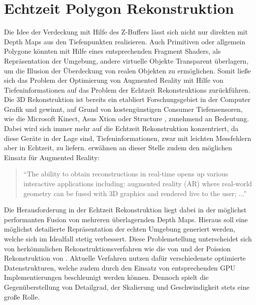\section{Echtzeit Polygon Rekonstruktion} \label{sec:polygon_reconstruction}

Die Idee der Verdeckung mit Hilfe des Z-Buffers lässt sich nicht nur direkten mit Depth Maps aus den Tiefenpunkten realisieren. Auch Primitiven oder allgemein Polygone könnten mit Hilfe eines entsprechenden Fragment Shaders, als Repräsentation der Umgebung, andere virtuelle Objekte Transparent überlagern, um die Illusion der Überdeckung von realen Objekten zu ermöglichen. Somit ließe sich das Problem der Optimierung von Augmented Reality mit Hilfe von Tiefeninformationen auf das Problem der Echtzeit Rekonstruktions zurückführen. \\

Die 3D Rekonstruktion ist bereits ein etabliert Forschungsgebiet in der Computer Grafik und gewinnt, auf Grund von kostengünstigen Consumer Tiefensensoren, wie die Microsoft Kinect, Asus Xtion oder Structure \citep{Struc48:online}, zunehmend an Bedeutung. Dabei wird sich immer mehr auf die Echtzeit Rekonstruktion konzentriert, da diese Geräte in der Lage sind, Tiefeninformationen, zwar mit leichten Messfehlern aber in Echtzeit, zu liefern. \citet{niessner2013real} erwähnen an dieser Stelle zudem den möglichen Einsatz für Augmented Reality:

\begin{quote}
\enquote{The ability to obtain reconstructions
in real-time opens up various interactive applications including:
augmented reality (AR) where real-world geometry can be fused
with 3D graphics and rendered live to the user; ...} \citep{niessner2013real}
\end{quote}

Die Herausforderung in der Echtzeit Rekonstruktion liegt dabei in der möglichst performanten Fusion von mehreren überlagernden Depth Maps. Hieraus soll eine möglichst detailierte Repräsentation der echten Umgebung generiert werden, welche sich im Idealfall stetig verbessert. Diese Problemstellung unterscheidet sich von herkömmlichen Rekonstruktionsverfahren wie die von \citet{hoppe1992surface} und der Poission Rekonstruktion von \citet{kazhdan2006poisson}. Aktuelle Verfahren nutzen dafür verschiedenste optimierte Datenstrukturen, welche zudem durch den Einsatz von entsprechenden GPU Implementierungen beschleunigt werden können. Dennoch spielt die Gegenüberstellung von Detailgrad, der Skalierung und Geschwindigkeit stets eine große Rolle. \citet{niessner2013real} \\

